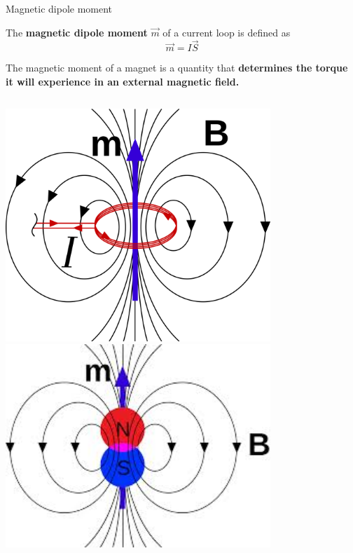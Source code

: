 %
%
%

\begin{frame}{Magnetic dipole moment}

The {\bf magnetic dipole moment} $\vec{m}$ of a current loop is defined as
\begin{equation*}
  \vec{m} = I \vec{S}
\end{equation*}

The magnetic moment of a magnet is a quantity that
{\bf determines the torque it will experience in an external magnetic field.}

\begin{columns}
  \begin{column}{0.30\textwidth}
    \begin{center}
      \includegraphics[width=0.75\textwidth]{./images/schematics/magnetic_dipole_moment_02.png}
      \vspace{0.2cm}
      \includegraphics[width=0.75\textwidth]{./images/schematics/magnetic_dipole_moment_01.jpg}\\

\end{center}
\end{column}
\end{columns}
\end{frame}
